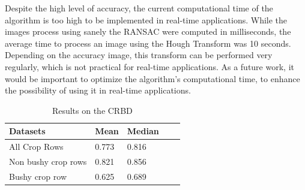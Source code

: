 Despite the high level of accuracy, the current computational time of the algorithm is too high to be implemented in real-time applications. While the images process using sanely the RANSAC were computed in milliseconds, the average time to process an image using the Hough Transform was 10 seconds. Depending on the accuracy image, this transform can be performed very regularly, which is not practical for real-time applications. As a future work,
it would be important to optimize the algorithm's computational time, to enhance the possibility of using it in real-time applications.

\begin{table}[h]
\begin{center}
 \label{tab:tabnefz}
 \begin{tabular}{|l|l|l|l|l}
 \hline
 Datasets & Mean & Median \\ \hline \hline
 All Crop Rows & 0.773 & 0.816 \\
 Non bushy crop rows & 0.821 & 0.856  \\
 Bushy crop row & 0.625 & 0.689 \\
 \hline
 \end{tabular}
\end{center}
 \caption{Results on the CRBD}\vspace{1ex}

\end{table}


